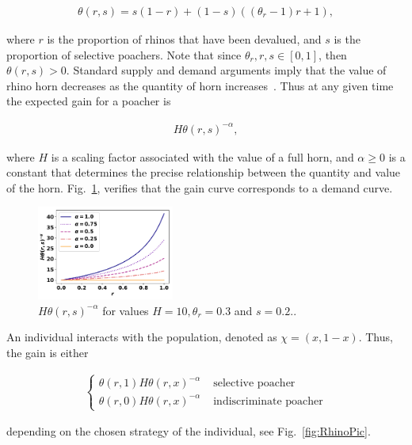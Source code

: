 \documentclass[10pt]{article}
\begin{document}
\begin{eqnarray}
	\label{eqn:theta}
	\theta(r, s) = s (1 - r) + (1 - s) ((\theta_r - 1) r + 1),
\end{eqnarray}

where \(r\) is the proportion of rhinos that have been devalued, and \(s\) is the 
proportion of selective poachers. Note that since \(\theta_r, r, s  \in [0, 1]\), then
\(\theta(r, s) > 0\). Standard supply and demand arguments imply that the value
of rhino horn decreases as the quantity of horn increases~\cite{mankiw2010}.
Thus at any given time the expected gain for a poacher is

\begin{eqnarray}
	\label{eqn:individual_gain}
 	H \theta(r,s)^{-\alpha},
\end{eqnarray}

where \(H\) is a scaling factor associated with the value of a full horn, and 
\(\alpha \geq 0\) is a constant that determines the precise relationship between
the quantity and value of the horn.  Fig.~\ref{fig:GainCurve}, verifies that the 
gain curve corresponds to a demand curve.

\begin{figure}[!htbp]
\centering
\includegraphics[width=0.4\textwidth]{images/gain_curve.pdf}
\caption{\label{fig:GainCurve} \(H \theta(r, s) ^{- \alpha}\) for values 
\(H = 10, \theta_r = 0.3\) and \(s = 0.2.\).}
\end{figure}

An individual interacts with the population, denoted as \(\chi=(x, 1 -x )\). Thus,
the gain is either

\begin{eqnarray}
	\label{eqn:gain}
	\left\{
	\begin{array}{cl}
	\theta(r, 1) H \theta(r, x)^{-\alpha} & \mbox{ selective poacher}
	\\
	\theta(r, 0) H \theta(r, x)^{-\alpha} & \mbox{ indiscriminate poacher}
	\end{array} \right.
\end{eqnarray}

depending on the chosen strategy of the individual, see Fig.~\ref{fig:RhinoPic}.
\end{document}
